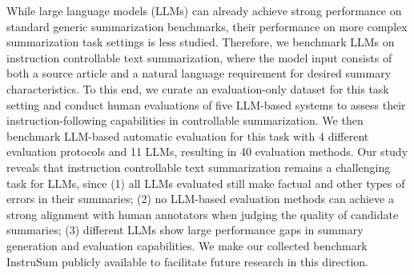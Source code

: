 While large language models (LLMs) can already achieve strong performance on standard generic summarization benchmarks, their performance on more complex summarization task settings is less studied. Therefore, we benchmark LLMs on instruction controllable text summarization, where the model input consists of both a source article and a natural language requirement for desired summary characteristics. To this end, we curate an evaluation-only dataset for this task setting and conduct human evaluations of five LLM-based systems to assess their instruction-following capabilities in controllable summarization. We then benchmark LLM-based automatic evaluation for this task with 4 different evaluation protocols and 11 LLMs, resulting in 40 evaluation methods. Our study reveals that instruction controllable text summarization remains a challenging task for LLMs, since (1) all LLMs evaluated still make factual and other types of errors in their summaries; (2) no LLM-based evaluation methods can achieve a strong alignment with human annotators when judging the quality of candidate summaries; (3) different LLMs show large performance gaps in summary generation and evaluation capabilities. We make our collected benchmark InstruSum publicly available to facilitate future research in this direction.